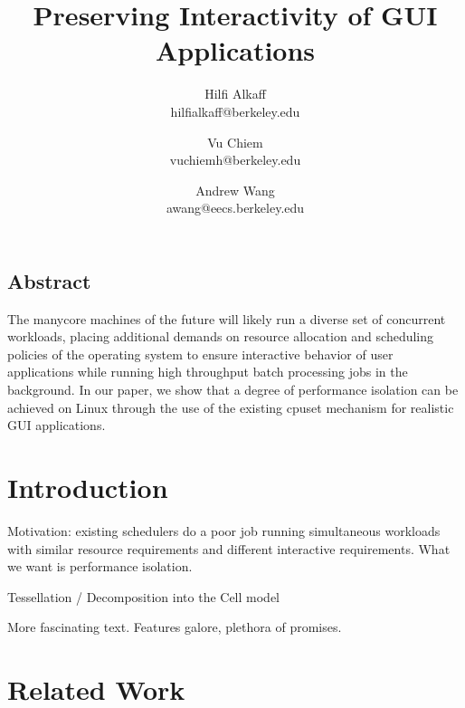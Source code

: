 \documentclass[letterpaper,twocolumn,10pt]{article}
\begin{document}
\date{}

\title{\Large \bf Preserving Interactivity of GUI Applications}

\author{
{\rm Hilfi Alkaff}\\
hilfialkaff@berkeley.edu
\and
{\rm Vu Chiem}\\
vuchiemh@berkeley.edu
\and
{\rm Andrew Wang}\\
awang@eecs.berkeley.edu
} %

\maketitle

\thispagestyle{empty}


\subsection*{Abstract}
The manycore machines of the future will likely run a diverse set of concurrent workloads, placing additional demands on resource allocation and scheduling policies of the operating system to ensure interactive behavior of user applications while running high throughput batch processing jobs in the background. In our paper, we show that a degree of performance isolation can be achieved on Linux through the use of the existing cpuset mechanism for realistic GUI applications.

\section{Introduction}

Motivation: existing schedulers do a poor job running simultaneous workloads with similar resource requirements and different interactive requirements. What we want is performance isolation.

Tessellation / Decomposition into the Cell model


More fascinating text. Features galore, plethora of promises.\\

\section{Related Work}
\end{document}
